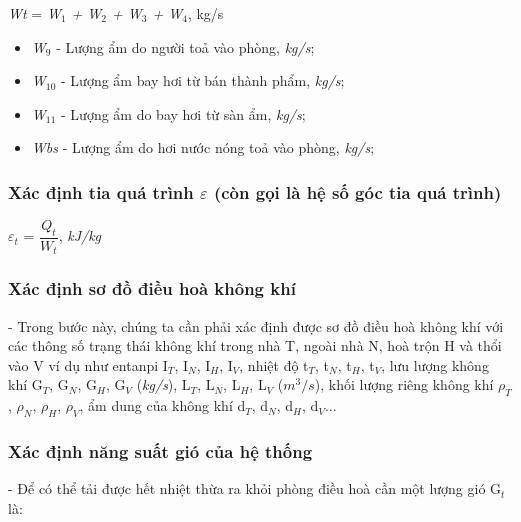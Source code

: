 \begin{center}
	\textit{W{\footnotesize t}} = \textit{W$ _{1} $ + W$ _{2} $ + W$ _{3} $ + W$ _{4} $}, kg/s
\end{center}

\begin{itemize}[leftmargin = 3cm, label = $\ast$]
	\item \textit{W$ _{9} $} - Lượng ẩm do người toả vào phòng, \textit{kg/s};
	
	\item \textit{W$ _{10} $} - Lượng ẩm bay hơi từ bán thành phẩm, \textit{kg/s};

	\item \textit{W$ _{11} $} - Lượng ẩm do bay hơi từ sàn ẩm, \textit{kg/s};
	
	\item \textit{W{\footnotesize bs}} - Lượng ẩm do hơi nước nóng toả vào phòng, \textit{kg/s};	
\end{itemize}
	
\subsubsection{Xác định tia quá trình {\Large $\varepsilon$} (còn gọi là hệ số góc tia quá trình)}
\begin{center}
	{\Large $\varepsilon_{t}$} = $ \dfrac{Q_{t}}{W_{t}} $, \textit{kJ/kg}
\end{center}

\subsubsection{Xác định sơ đồ điều hoà không khí}
- Trong bước này, chúng ta cần phải xác định được sơ đồ điều hoà không khí với các thông số trạng thái không khí trong nhà T, ngoài nhà N, hoà trộn H và thổi vào V ví dụ như entanpi I$_{T}$, I$_{N}$, I$_{H}$, I$_{V}$, nhiệt độ t$_{T}$, t$_{N}$, t$_{H}$, t$_{V}$, lưu lượng không khí G$_{T}$, G$_{N}$, G$_{H}$, G$_{V}$ (\textit{kg/s}), L$_{T}$, L$_{N}$, L$_{H}$, L$_{V}$ (\textit{$m^3/s$}), khối lượng riêng không khí $\rho_{T}$, $\rho_{N}$, $\rho_{H}$, $\rho_{V}$, ẩm dung của không khí d$_{T}$, d$_{N}$, d$_{H}$, d$_{V}$...

\subsubsection{Xác định năng suất gió của hệ thống}
- Để có thể tải được hết nhiệt thừa ra khỏi phòng điều hoà cần một lượng gió G$_{t}$ là:

